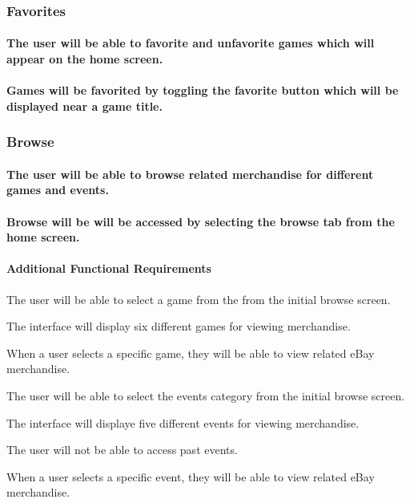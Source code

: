 \documentclass[onecolumn, draftclsnofoot,10pt, compsoc]{IEEEtran}
\begin{document}
\subsubsection{Favorites}
\paragraph{The user will be able to favorite and unfavorite games which will appear on the home screen.}
\paragraph{Games will be favorited by toggling the favorite button which will be displayed near a game title.}

\subsubsection{Browse}
\paragraph{The user will be able to browse related merchandise for different games and events.}
\paragraph{Browse will be will be accessed by selecting the browse tab from the home screen.}
\begin{itemize}
\paragraph{Additional Functional Requirements}
{\setlength\itemindent{50pt} \item The user will be able to select a game from the from the initial browse screen.}
{\setlength\itemindent{50pt} \item The interface will display six different games for viewing merchandise.}
{\setlength\itemindent{50pt} \item When a user selects a specific game, they will be able to view related eBay merchandise.}
{\setlength\itemindent{50pt} \item The user will be able to select the events category from the initial browse screen.}
{\setlength\itemindent{50pt} \item The interface will displaye five different events for viewing merchandise.}
{\setlength\itemindent{50pt} \item The user will not be able to access past events.}
{\setlength\itemindent{50pt} \item When a user selects a specific event, they will be able to view related eBay merchandise.}
\end{itemize}
\end{document}
